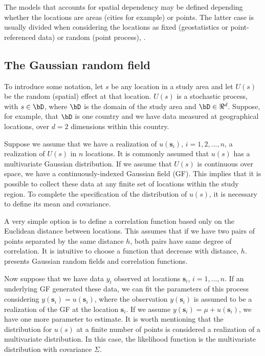 The models that accounts for spatial dependency 
may be defined depending whether the locations 
are areas (cities for example) or points. 
The latter case is usually divided when 
considering the locations as fixed 
(geostatistics or point-referenced data) 
or random (point process), \cite{cressie:1993}. 

\subsection{The Gaussian random field}

To introduce some notation, let $s$ be any 
location in a study area and let $U(s)$ be 
the random (spatial) effect at that location. 
$U(s)$ is a stochastic process, with $s\in \bD$, 
where $\bD$ is the domain of the study area and $\bD\in \Re^d$. 
Suppose, for example, that $\bD$ is one country 
and we have data measured at geographical 
locations, over $d=2$ dimensions within this country. 

Suppose we assume that we have a realization 
of $u(\textbf{s}_i)$, $i=1,2,...,n$, a realization of $U(s)$ 
in $n$ locations. It is commonly assumed that 
$u(s)$ has a multivariate Gaussian distribution. 
If we assume that $U(s)$ is continuous over space, 
we have a continuously-indexed Gaussian field (GF). 
This implies that it is possible to collect these 
data at any finite set of locations within the 
study region. 
To complete the specification of the distribution of 
$u(s)$, it is necessary to define its mean and covariance. 

A very simple option is to define a 
correlation function based only on the Euclidean 
distance between locations. 
This assumes that if we have two pairs of 
points separated by the same distance $h$, 
both pairs have same degree of correlation. 
It is intuitive to choose a function that 
decrease with distance, $h$. 
\cite{abrahamsen:1997} presents Gaussian 
random fields and correlation functions. 

Now suppose that we have data $y_i$ observed 
at locations $\textbf{s}_i$, $i=1,...,n$. 
If an underlying GF generated these data, 
we can fit the parameters of this process 
considering $y(\textbf{s}_i) = u(\textbf{s}_i)$, where the 
observation $y(\textbf{s}_i)$ is assumed to be a 
realization of the GF at the location $\textbf{s}_i$. 
If we assume $y(\textbf{s}_i) = \mu + u(\textbf{s}_i)$, 
we have one more parameter to estimate. 
It is worth mentioning that the distribution for 
$u(s)$ at a finite number of points is considered 
a realization of a multivariate distribution. 
In this case, the likelihood function 
is the multivariate distribution with 
covariance $\Sigma$. 

